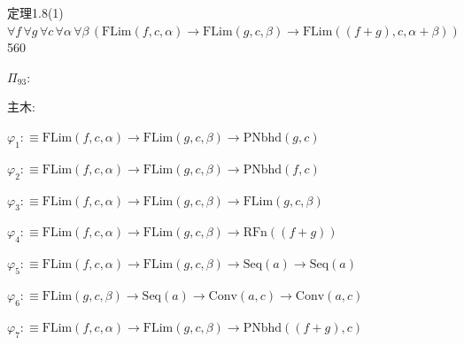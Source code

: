 \begin{fullproof}{定理1.8(1)}{$\forall f\,\forall g\,\forall c\,\forall \alpha\,\forall \beta\,(\mathrm{FLim}(f,c,\alpha) \to \mathrm{FLim}(g,c,\beta) \to \mathrm{FLim}((f + g),c,\alpha + \beta))$}{560}
\begin{ptree}
\end{ptree}
\noindent$\Pi_{93}$:
\begin{ptree}
\noLine
{}
\noLine
{}
\noLine
{}
\end{ptree}
\noindent 主木:
\begin{ptree}
\noLine
{}
\noLine
{}
\noLine
{}
\end{ptree}
\begin{abbrevlist}
\item $\varphi_{1} :\equiv \mathrm{FLim}(f,c,\alpha) \to \mathrm{FLim}(g,c,\beta) \to \mathrm{PNbhd}(g,c)$
\item $\varphi_{2} :\equiv \mathrm{FLim}(f,c,\alpha) \to \mathrm{FLim}(g,c,\beta) \to \mathrm{PNbhd}(f,c)$
\item $\varphi_{3} :\equiv \mathrm{FLim}(f,c,\alpha) \to \mathrm{FLim}(g,c,\beta) \to \mathrm{FLim}(g,c,\beta)$
\item $\varphi_{4} :\equiv \mathrm{FLim}(f,c,\alpha) \to \mathrm{FLim}(g,c,\beta) \to \mathrm{RFn}((f + g))$
\item $\varphi_{5} :\equiv \mathrm{FLim}(f,c,\alpha) \to \mathrm{FLim}(g,c,\beta) \to \mathrm{Seq}(a) \to \mathrm{Seq}(a)$
\item $\varphi_{6} :\equiv \mathrm{FLim}(g,c,\beta) \to \mathrm{Seq}(a) \to \mathrm{Conv}(a,c) \to \mathrm{Conv}(a,c)$
\item $\varphi_{7} :\equiv \mathrm{FLim}(f,c,\alpha) \to \mathrm{FLim}(g,c,\beta) \to \mathrm{PNbhd}((f + g),c)$

\end{abbrevlist}
\end{fullproof}
